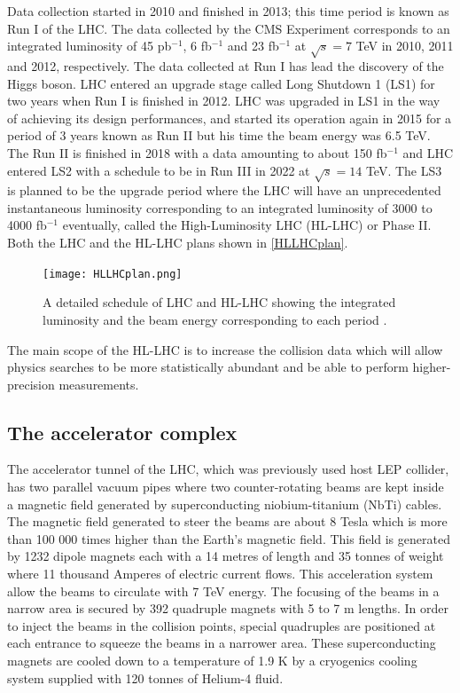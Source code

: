 Data collection started in 2010 and finished in 2013; this time period is known as Run I of the LHC. The data collected by the CMS Experiment corresponds to an integrated luminosity of 45 pb$^{-1}$, 6 fb$^{-1}$ and 23 fb$^{-1}$ at $\sqrt{s}=7$ TeV in 2010, 2011 and 2012, respectively. The data collected at Run I has lead the discovery of the Higgs boson. LHC entered an upgrade stage called Long Shutdown 1 (LS1) for two years when Run I is finished in 2012. LHC was upgraded in LS1 in the way of achieving its design performances, and started its operation again in 2015 for a period of 3 years known as Run II but his time the beam energy was 6.5 TeV. The Run II is finished in 2018 with a data amounting to about 150 fb$^{-1}$ and LHC entered LS2 with a schedule to be in Run III in 2022 at $\sqrt{s}=14$ TeV. The LS3 is planned to be the upgrade period where the LHC will have an unprecedented instantaneous luminosity corresponding to an integrated luminosity of 3000 to 4000 fb$^{-1}$ eventually, called the High-Luminosity LHC (HL-LHC) or Phase II. Both the LHC and the HL-LHC plans shown in \autoref{HLLHCplan}.

\begin{figure}[ht]
	\centering
	\texttt{[image: HLLHCplan.png]}
	\vspace{2mm}
	\caption[A detailed schedule of LHC and HL-LHC showing the integrated luminosity and the beam energy corresponding to each period.]
	{A detailed schedule of LHC and HL-LHC showing the integrated luminosity and the beam energy corresponding to each period \cite{Apollinari:2284929}.}
	\label{HLLHCplan}
\end{figure}

The main scope of the HL-LHC is to increase the collision data which will allow physics searches to be more statistically abundant and be able to perform higher-precision measurements.

\subsection{The accelerator complex}

The accelerator tunnel of the LHC, which was previously used host LEP collider, has two parallel vacuum pipes where two counter-rotating beams are kept inside a magnetic field generated by superconducting niobium-titanium (NbTi) cables. The magnetic field generated to steer the beams are about 8 Tesla which is more than 100 000 times higher than the Earth's magnetic field. This field is generated by  1232 dipole magnets each with a 14 metres of length and 35 tonnes of weight where 11 thousand Amperes of electric current flows. This acceleration system allow the beams to circulate with 7 TeV energy. The focusing of the beams in a narrow area is secured by 392 quadruple magnets with 5 to 7 m lengths. In order to inject the beams in the collision points, special quadruples are positioned at each entrance to squeeze the beams in a narrower area. These superconducting magnets are cooled down to a temperature of 1.9 K by a cryogenics cooling system supplied with 120 tonnes of Helium-4 fluid.

